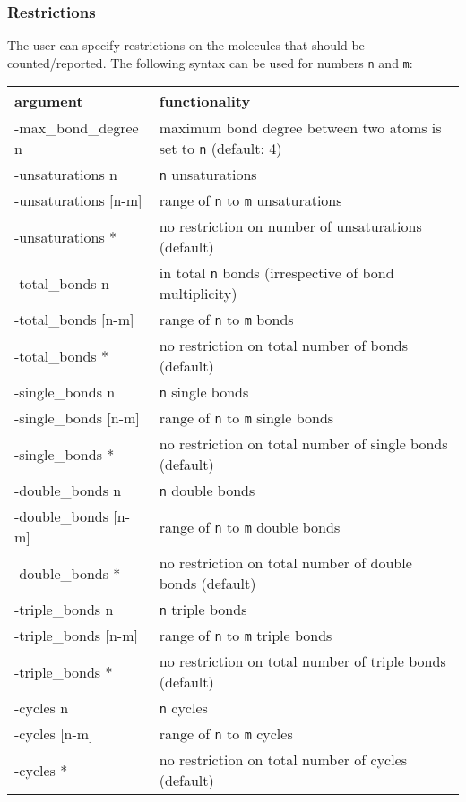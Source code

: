 \documentclass[a4paper,11pt]{article}
\begin{document}
\subsubsection{Restrictions}\label{sec:restrictions}

The user can specify restrictions on the molecules that should be counted/reported. The following syntax can be used for numbers \texttt{n} and \texttt{m}:

\begin{table}[H]
\begin{tabular}{>{\ttfamily\raggedright}p{}|p{}}
    \hline
    \textnormal{argument} & functionality \\
    \hline\hline
    -max\_bond\_degree n& maximum bond degree between two atoms is set to \texttt{n} (default: 4)\\
    \hline
    -unsaturations n & \texttt{n} unsaturations \\
    -unsaturations [n-m] & range of \texttt{n} to \texttt{m} unsaturations \\
    -unsaturations * & no restriction on number of unsaturations (default)\\
    \hline
    -total\_bonds n & in total \texttt{n} bonds (irrespective of bond multiplicity) \\
    -total\_bonds [n-m] & range of \texttt{n} to \texttt{m} bonds \\
    -total\_bonds * & no restriction on total number of bonds (default)\\
    \hline
    -single\_bonds n & \texttt{n} single bonds \\
    -single\_bonds [n-m] & range of \texttt{n} to \texttt{m} single bonds \\
    -single\_bonds * & no restriction on total number of single bonds (default)\\
    \hline
    -double\_bonds n & \texttt{n} double bonds \\
    -double\_bonds [n-m] & range of \texttt{n} to \texttt{m} double bonds \\
    -double\_bonds * & no restriction on total number of double bonds (default)\\
    \hline
    -triple\_bonds n & \texttt{n} triple bonds \\
    -triple\_bonds [n-m] & range of \texttt{n} to \texttt{m} triple bonds \\
    -triple\_bonds * & no restriction on total number of triple bonds (default)\\
    \hline
    -cycles n & \texttt{n} cycles \\
    -cycles [n-m] & range of \texttt{n} to \texttt{m} cycles \\
    -cycles * & no restriction on total number of cycles (default)\\
    \hline
\end{tabular}
\end{table}
\end{document}
